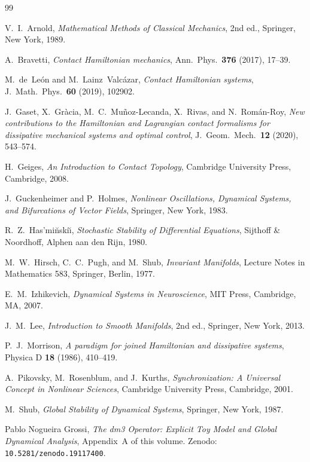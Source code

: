 \documentclass[12pt, oneside]{book}
\theoremstyle{plain}
\theoremstyle{definition}
\theoremstyle{remark}
\begin{document}
\begin{thebibliography}{99}

V.~I.~Arnold,
\emph{Mathematical Methods of Classical Mechanics},
2nd ed., Springer, New York, 1989.

A.~Bravetti,
\emph{Contact Hamiltonian mechanics},
Ann.\ Phys.\ \textbf{376} (2017), 17--39.

M.~de~Le{\'o}n and M.~Lainz~Valc{\'a}zar,
\emph{Contact Hamiltonian systems},
J.\ Math.\ Phys.\ \textbf{60} (2019), 102902.

J.~Gaset, X.~Gr{\`a}cia, M.~C.~Mu{\~n}oz-Lecanda, X.~Rivas,
and N.~Rom{\'a}n-Roy,
\emph{New contributions to the Hamiltonian and Lagrangian contact
formalisms for dissipative mechanical systems and optimal control},
J.~Geom.\ Mech.\ \textbf{12} (2020), 543--574.

H.~Geiges,
\emph{An Introduction to Contact Topology},
Cambridge University Press, Cambridge, 2008.

J.~Guckenheimer and P.~Holmes,
\emph{Nonlinear Oscillations, Dynamical Systems, and Bifurcations
of Vector Fields},
Springer, New York, 1983.

R.~Z.~Has{'}mi{\u{n}}ski{\u{\i}},
\emph{Stochastic Stability of Differential Equations},
Sijthoff \& Noordhoff, Alphen aan den Rijn, 1980.

M.~W.~Hirsch, C.~C.~Pugh, and M.~Shub,
\emph{Invariant Manifolds},
Lecture Notes in Mathematics 583, Springer, Berlin, 1977.

E.~M.~Izhikevich,
\emph{Dynamical Systems in Neuroscience},
MIT Press, Cambridge, MA, 2007.

J.~M.~Lee,
\emph{Introduction to Smooth Manifolds},
2nd ed., Springer, New York, 2013.

P.~J.~Morrison,
\emph{A paradigm for joined Hamiltonian and dissipative systems},
Physica D \textbf{18} (1986), 410--419.

A.~Pikovsky, M.~Rosenblum, and J.~Kurths,
\emph{Synchronization: A Universal Concept in Nonlinear Sciences},
Cambridge University Press, Cambridge, 2001.

M.~Shub,
\emph{Global Stability of Dynamical Systems},
Springer, New York, 1987.

Pablo Nogueira Grossi,
\emph{The dm3 Operator: Explicit Toy Model and Global Dynamical
Analysis},
Appendix~A of this volume. Zenodo: \texttt{10.5281/zenodo.19117400}.

\end{thebibliography}
\cleardoublepage
\end{document}
